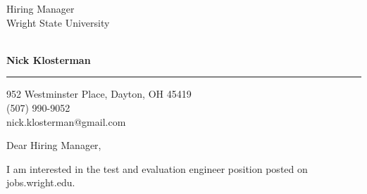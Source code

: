 \documentclass{letter} %
\makeatletter
\newcommand{\contactperson}{Hiring Manager}
\newcommand{\contactCompany}{Wright State University}
\newcommand{\contactStreetAddress}{ }  %
\newcommand{\contactCityStateZip}{ }
\newcommand{\position}{test and evaluation engineer }%
\newcommand{\jobpostingsource}{jobs.wright.edu} %
\newcommand{\personalphonenumber}{(507) 990-9052}
\newcommand{\personalemail}{nick.klosterman@gmail.com}
\makeatother
\begin{document}
\signature{Nick Klosterman}           %
\longindentation=0pt                       %
\let\raggedleft\raggedright                %
 

 
\begin{letter}{\contactperson \\
\contactCompany \\
\contactStreetAddress \\
\contactCityStateZip

}

  \begin{flushright}
 \hfill   \large\bf Nick Klosterman  \\
\end{flushright}
\begin{flushright}
    \medskip\hrule height 1pt
    \hfill 952 Westminster Place, Dayton, OH 45419 \\
    \hfill \personalphonenumber \\
    \hfill \personalemail
  \end{flushright} 
\vfill %

 
\opening{Dear \contactperson ,} 

\noindent 
I am interested in the \position position posted on \jobpostingsource. 


\end{letter}
\end{document}
